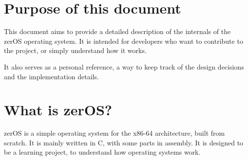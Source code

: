 \section{Purpose of this document}

This document aims to provide a detailed description of the internals of the zerOS operating system. It is intended for developers who want to contribute to the project, or simply understand how it works.

It also serves as a personal reference, a way to keep track of the design decisions and the implementation details.

\section{What is zerOS?}

zerOS is a simple operating system for the x86-64 architecture, built from scratch. It is mainly written in C, with some parts in assembly. It is designed to be a learning project, to understand how operating systems work.